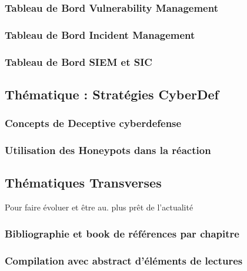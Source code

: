 \subsubsection{Tableau de Bord Vulnerability Management}
\subsubsection{Tableau de Bord Incident Management}
\subsubsection{Tableau de Bord SIEM et SIC}


\subsection{Thématique : Stratégies CyberDef}
\subsubsection{Concepts de Deceptive cyberdefense}
\subsubsection{Utilisation des Honeypots dans la réaction }


\subsection{Thématiques Transverses}
Pour faire évoluer et être au. plus prêt de l'actualité
\subsubsection{Bibliographie et book de références par chapitre}
\subsubsection{Compilation avec abstract d'éléments de lectures}

